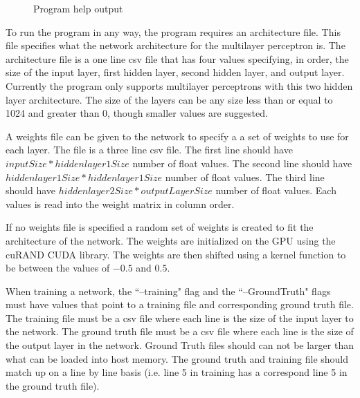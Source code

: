 \documentclass[jair, twoside,11pt,theapa]{article}
\begin{document}
\begin{figure}[h]
    \centering
    \caption{Program help output}
    \label{HelpOutput}
\end{figure}

To run the program in any way, the program requires an architecture file. 
This file specifies what the network architecture for the multilayer perceptron is. 
The architecture file is a one line csv file that has four values specifying, in order, the size of the input layer, first hidden layer, second hidden layer, and output layer. 
Currently the program only supports multilayer perceptrons with this two hidden layer architecture.
The size of the layers can be any size less than or equal to 1024 and greater than 0, though smaller values are suggested.

A weights file can be given to the network to specify a a set of weights to use for each layer. 
The file is a three line csv file. 
The first line should have $inputSize * hiddenlayer1Size$ number of float values. 
The second line should have $hiddenlayer1Size * hiddenlayer1Size$ number of float values. 
The third line should have $hiddenlayer2Size * outputLayerSize$ number of float values. 
Each values is read into the weight matrix in column order. 

If no weights file is specified a random set of weights is created to fit the architecture of the network. 
The weights are initialized on the GPU using the cuRAND CUDA library. 
The weights are then shifted using a kernel function to be between the values of $-0.5$ and $0.5$.

When training a network, the ``--training" flag and the ``--GroundTruth" flags must have values that point to a training file and corresponding ground truth file. 
The training file must be a csv file where each line is the size of the input layer to the network. 
The ground truth file must be a csv file where each line is the size of the output layer in the network.
Ground Truth files should can not be larger than what can be loaded into host memory. 
The ground truth and training file should match up on a line by line basis (i.e. line 5 in training has a correspond line 5 in the ground truth file).
\end{document}
